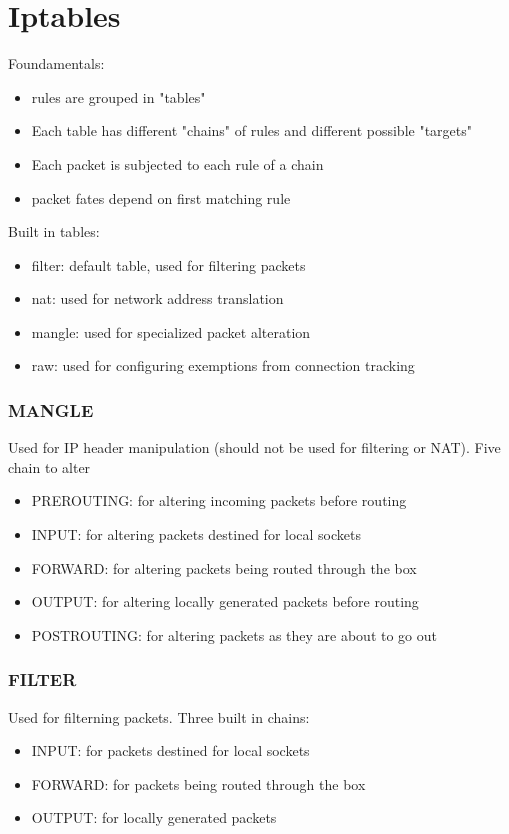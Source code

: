 \chapter{Iptables}
Foundamentals: 
\begin{itemize}
    \item rules are grouped in "tables"
    \item Each table has different "chains" of rules and different possible "targets"
    \item Each packet is subjected to each rule of a chain
    \item packet fates depend on first matching rule 
\end{itemize}

Built in tables:
\begin{itemize}
    \item filter: default table, used for filtering packets
    \item nat: used for network address translation
    \item mangle: used for specialized packet alteration
    \item raw: used for configuring exemptions from connection tracking
\end{itemize}

\subsection{MANGLE}
Used for IP header manipulation (should not be used for filtering or NAT).
Five chain to alter
\begin{itemize}
    \item PREROUTING: for altering incoming packets before routing
    \item INPUT: for altering packets destined for local sockets
    \item FORWARD: for altering packets being routed through the box
    \item OUTPUT: for altering locally generated packets before routing
    \item POSTROUTING: for altering packets as they are about to go out
\end{itemize}

\subsection{FILTER}
Used for filterning packets. Three built in chains:
\begin{itemize}
    \item INPUT: for packets destined for local sockets
    \item FORWARD: for packets being routed through the box
    \item OUTPUT: for locally generated packets
\end{itemize}

